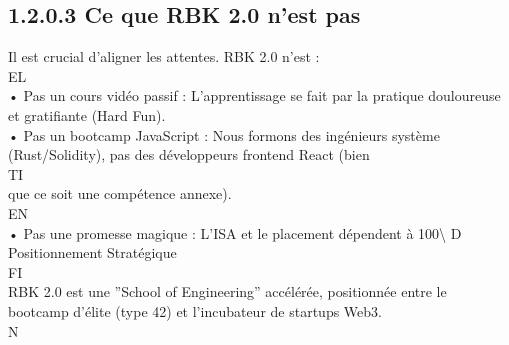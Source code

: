 \subsection{1.2.0.3 Ce que RBK 2.0 n’est pas}
\vspace{0.5em}
Il est crucial d’aligner les attentes. RBK 2.0 n’est :\\
\vspace{0.5em}
\vspace{0.5em}
\vspace{0.5em}
\vspace{0.5em}
EL\\
• Pas un cours vidéo passif : L’apprentissage se fait par la pratique douloureuse et gratifiante (Hard Fun).\\
\vspace{0.5em}
• Pas un bootcamp JavaScript : Nous formons des ingénieurs système (Rust/Solidity), pas des développeurs frontend React (bien\\
\vspace{0.5em}
\vspace{0.5em}
\vspace{0.5em}
\vspace{0.5em}
TI\\
que ce soit une compétence annexe).\\
\vspace{0.5em}
\vspace{0.5em}
\vspace{0.5em}
\vspace{0.5em}
EN\\
• Pas une promesse magique : L’ISA et le placement dépendent à 100\textbackslash{}%
\vspace{0.5em}
\vspace{0.5em}
\vspace{0.5em}
\vspace{0.5em}
D\\
Positionnement Stratégique\\
\vspace{0.5em}
\vspace{0.5em}
\vspace{0.5em}
\vspace{0.5em}
FI\\
RBK 2.0 est une ”School of Engineering” accélérée, positionnée entre le bootcamp d’élite (type 42) et l’incubateur de startups Web3.\\
\vspace{0.5em}
N\\
